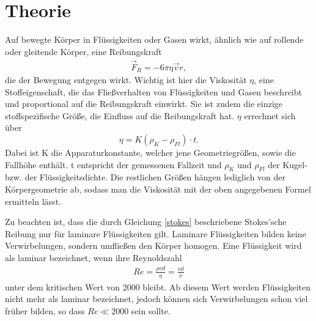 \newpage					%




	\section{Theorie}
Auf bewegte Körper in Flüssigkeiten oder Gasen wirkt, ähnlich wie auf rollende oder gleitende Körper, eine Reibungskraft
\begin{align}
\vec F_R=-6 \pi \eta \vec{v} r,
\label{stokes}
\end{align}
 die der Bewegung entgegen wirkt. Wichtig ist hier die Viskosität $\eta $, eine Stoffeigenschaft, die das Fließverhalten von Flüssigkeiten und Gasen beschreibt und proportional auf die Reibungskraft einwirkt. Sie ist zudem die einzige stoffspezifische Größe, die Einfluss auf die Reibungskraft hat. 
$\eta$ errechnet sich über
\begin{equation}
  \eta = K(\rho_K - \rho_{Fl})\cdot t.
  \label{viskos}
 \end{equation}
Dabei ist K die Apparaturkonstante, welcher jene Geometriegrößen, sowie die Fallhöhe enthält. t entspricht der gemessenen Fallzeit und $\rho_K$ und $\rho_{Fl}$ der Kugel- bzw. der Flüssigkeitsdichte.
Die restlichen Größen hängen lediglich von der Körpergeometrie ab, sodass man die Viskosität mit der oben angegebenen Formel ermitteln lässt. 

 Zu beachten ist, dass die durch Gleichung \eqref{stokes} beschriebene Stokes'sche Reibung nur für laminare Flüssigkeiten gilt. Laminare Flüssigkeiten bilden keine Verwirbelungen, sondern umfließen den Körper homogen. Eine Flüssigkeit wird als laminar bezeichnet, wenn ihre Reynoldszahl
 \begin{align}
 Re= \frac{\rho v d}{\eta} = \frac{v d}{\nu}
 \label{rey}
 \end{align}
unter dem kritischen Wert von 2000 bleibt. Ab diesem Wert werden Flüssigkeiten nicht mehr als laminar bezeichnet, jedoch können sich Verwirbelungen schon viel früher bilden, so dass  $Re \ll 2000$ sein sollte. 
